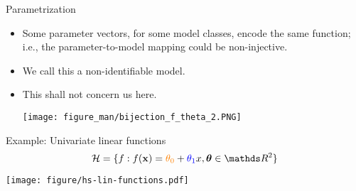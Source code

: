 \documentclass[11pt,compress,t,notes=noshow, xcolor=table]{beamer}
\begin{document}
\begin{vbframe}{Parametrization}
\begin{itemize}
    
    \framebreak
    
    \item Some parameter vectors, for some model classes, encode the same function; i.e., the parameter-to-model mapping could be non-injective. 
    \item We call this a non-identifiable model.
    \item This shall not concern us here.
    
    \begin{center}
      \texttt{[image: figure\_man/bijection\_f\_theta\_2.PNG]} 
    \end{center}
    
  \end{itemize}
\end{vbframe}



\begin{vbframe}{Example: Univariate linear functions}
$$\Hspace = \{f: \fx = \textcolor{orange}{\theta_0} + 
  \textcolor{blue}{\theta_1} x, \thetav \in \R^2\}$$
  
  \begin{center}
    \texttt{[image: figure/hs-lin-functions.pdf]}
  \end{center}
  
\end{vbframe}
\end{document}
